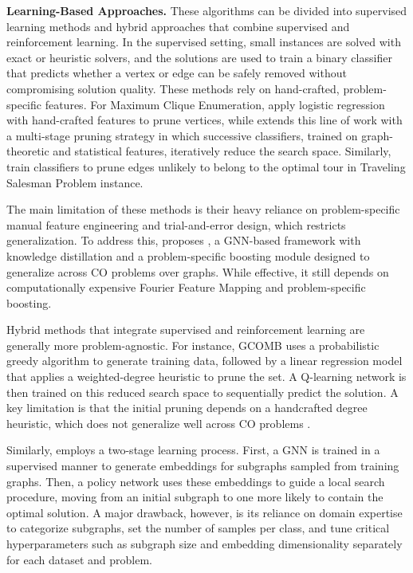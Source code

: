 \textbf{Learning-Based Approaches.} These algorithms can be divided into supervised learning methods and hybrid approaches that combine supervised and reinforcement learning. In the supervised setting, small instances are solved with exact or heuristic solvers, and the solutions are used to train a binary classifier that predicts whether a vertex or edge can be safely removed without compromising solution quality. These methods rely on hand-crafted, problem-specific features. For Maximum Clique Enumeration, \citet{lauri2019fine} apply logistic regression with hand-crafted features to prune vertices, while \citet{grassia2019learning,lauri2023learning} extends this line of work with a multi-stage pruning strategy in which successive classifiers, trained on graph-theoretic and statistical features, iteratively reduce the search space. Similarly, \citet{fitzpatrick2021learning,sun2021generalization} train classifiers to prune edges unlikely to belong to the optimal tour in Traveling Salesman Problem instance. 

The main limitation of these methods is their heavy reliance on problem-specific manual feature engineering and trial-and-error design, which restricts generalization. To address this, \citet{tian2024combhelper} proposes \comb, a GNN-based framework with knowledge distillation and a problem-specific boosting module designed to generalize across CO problems over graphs. While effective, it still depends on computationally expensive Fourier Feature Mapping and problem-specific boosting.


Hybrid methods that integrate supervised and reinforcement learning are generally more problem-agnostic. For instance, GCOMB \citep{manchanda2020gcomb} uses a probabilistic greedy algorithm to generate training data, followed by a linear regression model that applies a weighted-degree heuristic to prune the set. A Q-learning network is then trained on this reduced search space to sequentially predict the solution. A key limitation is that the initial pruning depends on a handcrafted degree heuristic, which does not generalize well across CO problems \citep{ireland2022lense}.

Similarly, \lense \citep{ireland2022lense} employs a two-stage learning process. First, a GNN is trained in a supervised manner to generate embeddings for subgraphs sampled from training graphs. Then, a policy network uses these embeddings to guide a local search procedure, moving from an initial subgraph to one more likely to contain the optimal solution. A major drawback, however, is its reliance on domain expertise to categorize subgraphs, set the number of samples per class, and tune critical hyperparameters such as subgraph size and embedding dimensionality separately for each dataset and problem.

